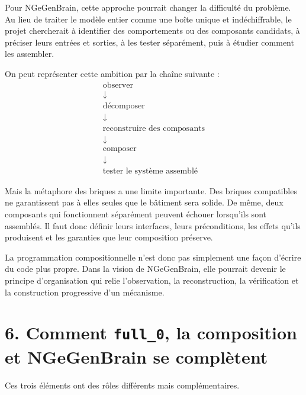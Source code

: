 \documentclass[11pt,a4paper]{article}
\begin{document}
Pour NGeGenBrain, cette approche pourrait changer la difficulté du problème. Au lieu de traiter le modèle entier comme une boîte unique et indéchiffrable, le projet chercherait à identifier des comportements ou des composants candidats, à préciser leurs entrées et sorties, à les tester séparément, puis à étudier comment les assembler.

On peut représenter cette ambition par la chaîne suivante :
\[
\begin{gathered}
\text{observer}\\
\downarrow\\
\text{décomposer}\\
\downarrow\\
\text{reconstruire des composants}\\
\downarrow\\
\text{composer}\\
\downarrow\\
\text{tester le système assemblé}
\end{gathered}
\]

Mais la métaphore des briques a une limite importante. Des briques compatibles ne garantissent pas à elles seules que le bâtiment sera solide. De même, deux composants qui fonctionnent séparément peuvent échouer lorsqu'ils sont assemblés. Il faut donc définir leurs interfaces, leurs préconditions, les effets qu'ils produisent et les garanties que leur composition préserve.

La programmation compositionnelle n'est donc pas simplement une façon d'écrire du code plus propre. Dans la vision de NGeGenBrain, elle pourrait devenir le principe d'organisation qui relie l'observation, la reconstruction, la vérification et la construction progressive d'un mécanisme.

\section*{6. Comment \texttt{full\_0}, la composition et NGeGenBrain se complètent}

Ces trois éléments ont des rôles différents mais complémentaires.
\end{document}
